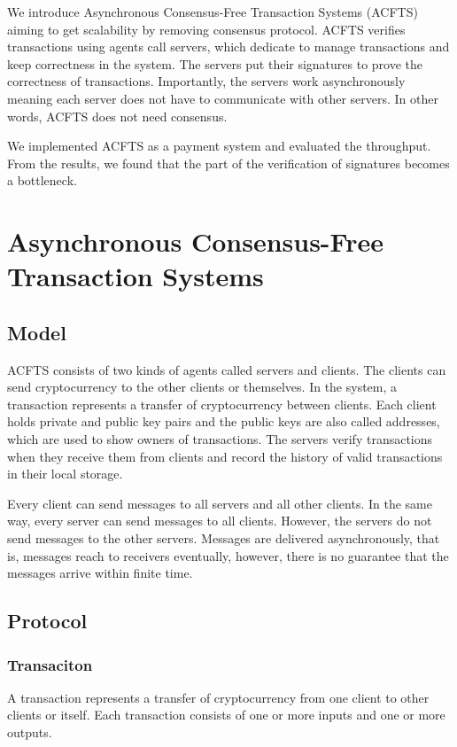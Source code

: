 \documentclass[a4paper, oneside]{discothesis}
\begin{document}
We introduce Asynchronous Consensus-Free Transaction Systems (ACFTS) aiming to get scalability
by removing consensus protocol.
ACFTS verifies transactions using agents call servers, which dedicate to manage transactions
and keep correctness in the system.
The servers put their signatures to prove the correctness of transactions.
Importantly, the servers work asynchronously meaning each server does not have to
communicate with other servers.
In other words, ACFTS does not need consensus.

We implemented ACFTS as a payment system and evaluated the throughput.
From the results, we found that the part of the verification of signatures becomes a bottleneck.

\chapter{Asynchronous Consensus-Free Transaction Systems}

\section{Model}
ACFTS consists of two kinds of agents called servers and clients.
The clients can send cryptocurrency to the other clients or themselves.
In the system, a transaction represents a transfer of cryptocurrency between clients.
Each client holds private and public key pairs
and the public keys are also called addresses, which are used to show owners of transactions.
The servers verify transactions when they receive them from clients
and record the history of valid transactions in their local storage.

Every client can send messages to all servers and all other clients.
In the same way, every server can send messages to all clients.
However, the servers do not send messages to the other servers.
Messages are delivered asynchronously, that is, messages reach to receivers eventually,
however, there is no guarantee that the messages arrive within finite time.


\section{Protocol}

\subsection{Transaciton}
A transaction represents a transfer of cryptocurrency from one client to other clients or itself.
Each transaction consists of one or more inputs and one or more outputs.
\end{document}
